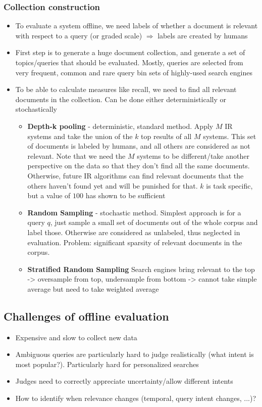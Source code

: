 \subsubsection{Collection construction}
\begin{itemize}
	\item To evaluate a system offline, we need labels of whether a document is relevant with respect to a query (or graded scale) $\Rightarrow$ labels are created by humans
	\item First step is to generate a huge document collection, and generate a set of topics/queries that should be evaluated. Mostly, queries are selected from very frequent, common and rare query bin sets of highly-used search engines 
	\item To be able to calculate measures like recall, we need to find all relevant documents in the collection. Can be done either deterministically or stochastically
	\begin{itemize}
		\item \textbf{Depth-k pooling} - deterministic, standard method. Apply $M$ IR systems and take the union of the $k$ top results of all $M$ systems. This set of documents is labeled by humans, and all others are considered as not relevant. Note that we need the $M$ systems to be different/take another perspective on the data so that they don't find all the same documents. Otherwise, future IR algorithms can find relevant documents that the others haven't found yet and will be punished for that. $k$ is task specific, but a value of $100$ has shown to be sufficient
		\item \textbf{Random Sampling} - stochastic method. Simplest approach is for a query $q$, just sample a small set of documents out of the whole corpus and label those. Otherwise are considered as unlabeled, thus neglected in evaluation. Problem: significant sparsity of relevant documents in the corpus. 
		\item \textbf{Stratified Random Sampling} Search engines bring relevant to the top -> oversample from top, undersample from bottom -> cannot take simple average but need to take weighted average
	\end{itemize}
\end{itemize}
\subsection{Challenges of offline evaluation}
\label{sec:offline_eval_problems}
\begin{itemize} 
	\item Expensive and slow to collect new data
	\item Ambiguous queries are particularly hard to judge realistically (what intent is most popular?). Particularly hard for personalized searches
	\item Judges need to correctly appreciate uncertainty/allow different intents
	\item How to identify when relevance changes (temporal, query intent changes, ...)?
\end{itemize}
